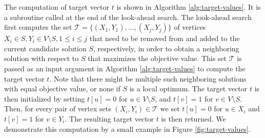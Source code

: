 \documentclass[draft,final]{vutinfth} %
\begin{document}
The computation of target vector $t$ is shown in Algorithm \ref{alg:target-values}. It is a subroutine called at the end of the look-ahead search. 
The look-ahead search first computes the set $\mathcal{T} = \{(X_1, Y_1), \dots, (X_j, Y_j)\}$ of vertices $X_i \in S, Y_i \in V \setminus S, 1 \leq i \leq j$ that need to be removed from and added to the current candidate solution $S$, respectively, in order to obtain a neighboring solution with respect to $S$ that maximizes the objective value. This set $\mathcal{T}$ is passed as an input argument in Algorithm \ref{alg:target-values} to compute the target vector $t$.   
Note that there might be multiple such neighboring solutions with equal objective value, or none if $S$ is a local optimum. 
The target vector $t$ is then initialized by setting $t[u] = 0$ for $u \in V \setminus S$, and $t[v] = 1$ for $v \in V \setminus S$. Then, for every pair of vertex sets $(X_i, Y_i) \in \mathcal{T}$ we set $t[u] = 0$ for $u \in X_i$ and $t[v] = 1$ for $v \in Y_i$. The resulting target vector $t$ is then returned. 
We demonstrate this computation by a small example in Figure \ref{fig:target-values}. 

\end{document}
